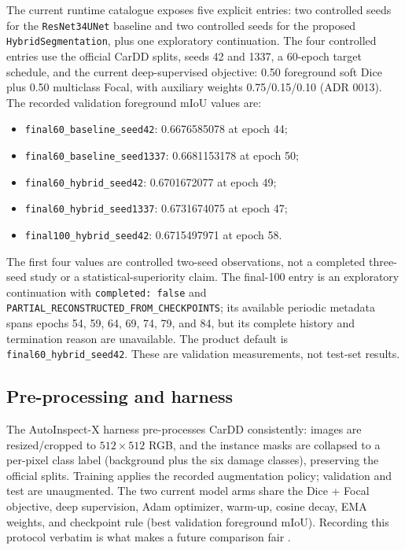 \documentclass[conference]{IEEEtran}
\begin{document}
The current runtime catalogue exposes five explicit entries: two controlled
seeds for the \texttt{ResNet34UNet} baseline and two controlled seeds for the
proposed \texttt{HybridSegmentation}, plus one exploratory continuation. The four
controlled entries use the official CarDD splits, seeds 42 and 1337, a
60-epoch target schedule, and the current deep-supervised objective: 0.50
foreground soft Dice plus 0.50 multiclass Focal, with auxiliary weights
0.75/0.15/0.10 (ADR 0013). The recorded validation foreground mIoU values are:
\begin{itemize}
  \item \texttt{final60\_baseline\_seed42}: 0.6676585078 at epoch 44;
  \item \texttt{final60\_baseline\_seed1337}: 0.6681153178 at epoch 50;
  \item \texttt{final60\_hybrid\_seed42}: 0.6701672077 at epoch 49;
  \item \texttt{final60\_hybrid\_seed1337}: 0.6731674075 at epoch 47;
  \item \texttt{final100\_hybrid\_seed42}: 0.6715497971 at epoch 58.
\end{itemize}
The first four values are controlled two-seed observations, not a completed
three-seed study or a statistical-superiority claim. The final-100 entry is an
exploratory continuation with \texttt{completed: false} and
\texttt{PARTIAL\_RECONSTRUCTED\_FROM\_CHECKPOINTS}; its available periodic
metadata spans epochs 54, 59, 64, 69, 74, 79, and 84, but its complete history
and termination reason are unavailable. The product default is
\texttt{final60\_hybrid\_seed42}. These are validation measurements, not test-set
results.

\subsection{Pre-processing and harness}
The AutoInspect-X harness pre-processes CarDD consistently: images are
resized/cropped to $512\times512$ RGB, and the instance masks are collapsed to a
per-pixel class label (background plus the six damage classes), preserving the
official splits. Training applies the recorded augmentation policy; validation
and test are unaugmented. The two current model arms share the Dice + Focal
objective, deep supervision, Adam optimizer, warm-up, cosine decay, EMA weights,
and checkpoint rule (best validation foreground mIoU). Recording this protocol
verbatim is what makes a future comparison fair \cite{hasan2025}.
\end{document}
